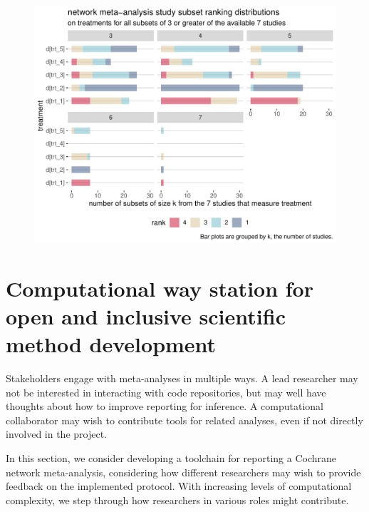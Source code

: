 \documentclass[12pt]{article}\usepackage[]{graphicx}\usepackage[]{color}
\makeatletter
\def\maxwidth{ %
  \ifdim\Gin@nat@width>\linewidth
    \linewidth
  \else
    \Gin@nat@width
  \fi
}
\newenvironment{knitrout}{}{} %
\makeatother
\begin{document}
\begin{figure}
\centering
\begin{knitrout}
\color{fgcolor}
\includegraphics[width=\maxwidth]{figure/leavem-1} 

\end{knitrout}

\caption{}
\label{fig:leavem}
\end{figure}




\section{Computational way station for open and inclusive scientific method development}\label{sec:comp}



Stakeholders engage with meta-analyses in multiple ways. A lead researcher may not be interested in interacting with code repositories, but may well have thoughts about how to improve reporting for inference. A computational collaborator may wish to contribute tools for related analyses, even if not directly involved in the project.

In this section, we consider developing a toolchain for reporting a Cochrane network meta-analysis, considering how different researchers may wish to provide feedback on the implemented protocol. With increasing levels of computational complexity, we step through how researchers in various roles might contribute.
\end{document}
